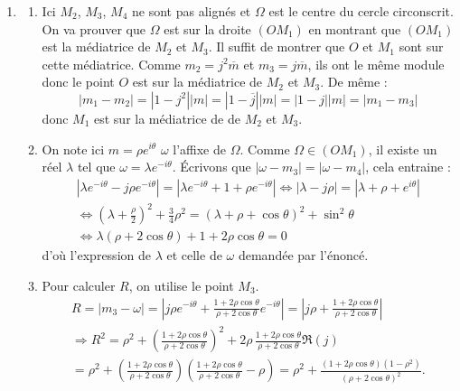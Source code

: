 \begin{enumerate}
\item \begin{enumerate}
 \item Ici $M_2$, $M_3$, $M_4$ ne sont pas alignés et $\Omega$ est le centre du cercle circonscrit. On va prouver que $\Omega$ est  sur la droite $(OM_1)$ en montrant que $(OM_1)$ est la médiatrice de $M_2$ et $M_3$.\newline
Il suffit de montrer que $O$ et $M_1$ sont sur cette médiatrice. Comme $m_2=j^2\overline{m}$ et $m_3=j\overline{m}$, ils ont le même module donc le point $O$ est sur la médiatrice de $M_2$ et $M_3$.\newline
De même :
\begin{displaymath}
 |m_1 - m_2|=|1-j^2||m| = |1-\overline{j}||m| = |1-j||m| = |m_1-m_3| 
\end{displaymath}
donc $M_1$ est sur la médiatrice de de $M_2$ et $M_3$.

\item On note ici $m=\rho e^{i\theta}$ $\omega$ l'affixe de $\Omega$. Comme $\Omega\in (OM_1)$, il existe un réel $\lambda$ tel que $\omega=\lambda e^{-i\theta}$. \'Ecrivons que $|\omega-m_3|=|\omega-m_4|$, cela entraine :
\begin{multline*}
 |\lambda e^{-i\theta} -j\rho e^{-i\theta}| = |\lambda e^{-i\theta}+1 +\rho e^{-i\theta}| \Leftrightarrow
|\lambda -j\rho| = |\lambda+\rho +e^{i\theta}| \\
\Leftrightarrow (\lambda + \frac{\rho}{2})^2 + \frac{3}{4}\rho^2 = (\lambda + \rho + \cos \theta)^2 + \sin^2\theta \\
\Leftrightarrow  \lambda(\rho + 2\cos\theta)+1+2\rho\cos \theta = 0
\end{multline*}
d'où l'expression de $\lambda$ et celle de $\omega$ demandée par l'énoncé.

\item Pour calculer $R$, on utilise le point $M_3$.
\begin{multline*}
 R = |m_3-\omega| = \left\vert j\rho e^{-i\theta} + \frac{1+2\rho\cos \theta}{\rho +2\cos \theta}e^{-i\theta}\right\vert
= \left\vert j\rho  + \frac{1+2\rho\cos \theta}{\rho +2\cos \theta}\right\vert\\
\Rightarrow R^2 
= \rho^2 + \left(\frac{1+2\rho\cos \theta}{\rho +2\cos \theta}\right)^2 + 2\rho\,\frac{1+2\rho\cos \theta}{\rho +2\cos \theta}\Re(j)\\
= \rho^2 + \left(\frac{1+2\rho\cos \theta}{\rho +2\cos \theta}\right)\left( \frac{1+2\rho\cos \theta}{\rho +2\cos \theta} - \rho\right)
= \rho^2 + \frac{(1 + 2\rho\cos \theta)(1-\rho^2)}{(\rho + 2\cos \theta)^2}.
\end{multline*}
\end{enumerate}


\end{enumerate}
